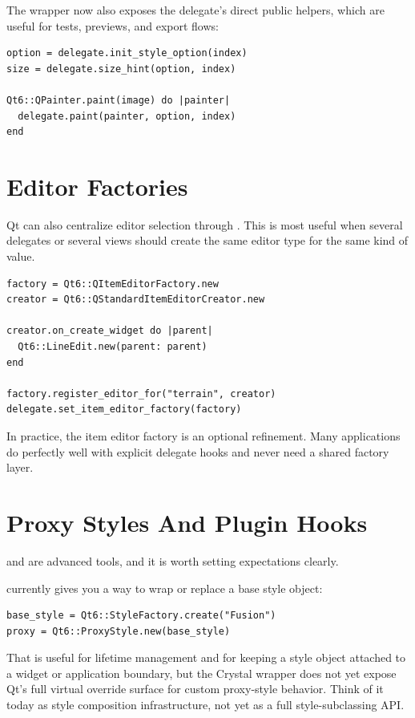 The wrapper now also exposes the delegate's direct public helpers, which are useful for tests, previews, and export flows:

\begin{lstlisting}[style=crystal]
option = delegate.init_style_option(index)
size = delegate.size_hint(option, index)

Qt6::QPainter.paint(image) do |painter|
  delegate.paint(painter, option, index)
end
\end{lstlisting}

\section{Editor Factories}

Qt can also centralize editor selection through . This is most useful when several delegates or several views should create the same editor type for the same kind of value.

\begin{lstlisting}[style=crystal]
factory = Qt6::QItemEditorFactory.new
creator = Qt6::QStandardItemEditorCreator.new

creator.on_create_widget do |parent|
  Qt6::LineEdit.new(parent: parent)
end

factory.register_editor_for("terrain", creator)
delegate.set_item_editor_factory(factory)
\end{lstlisting}

In practice, the item editor factory is an optional refinement. Many applications do perfectly well with explicit delegate hooks and never need a shared factory layer.

\section{Proxy Styles And Plugin Hooks}

 and  are advanced tools, and it is worth setting expectations clearly.

 currently gives you a way to wrap or replace a base style object:

\begin{lstlisting}[style=crystal]
base_style = Qt6::StyleFactory.create("Fusion")
proxy = Qt6::ProxyStyle.new(base_style)
\end{lstlisting}

That is useful for lifetime management and for keeping a style object attached to a widget or application boundary, but the Crystal wrapper does not yet expose Qt's full virtual override surface for custom proxy-style behavior. Think of it today as style composition infrastructure, not yet as a full style-subclassing API.

